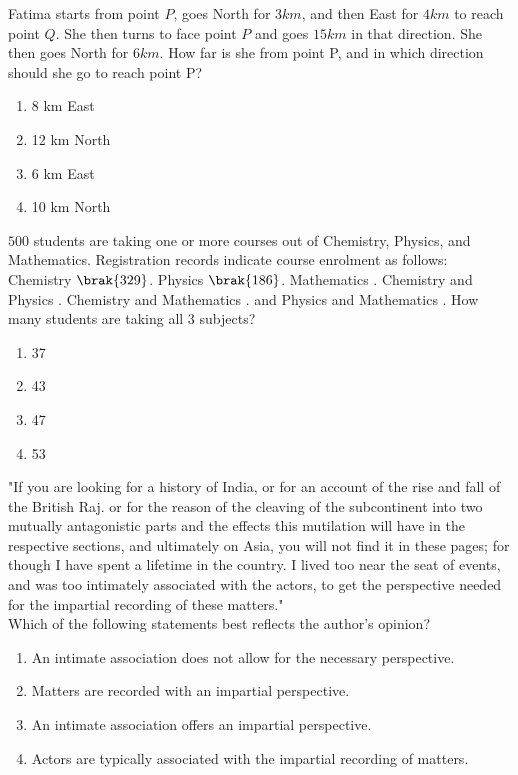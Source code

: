 \item Fatima starts from point $P$, goes North for $3 km$, and then East for $4 km$ to reach point $Q$. She then turns to face point $P$ and goes $15 km$ in that direction. She then goes North for $6 km$. How far is she from point P, and in which direction should she go to reach point P?
    \begin{enumerate}
        \item 8 km East
       \item 12 km North
        \item 6 km East
        \item 10 km North
\end{enumerate}
\item $500$ students are taking one or more courses out of Chemistry, Physics, and Mathematics.
Registration records indicate course enrolment as follows: Chemistry $\brak{329}$. Physics $\brak{186}$.
Mathematics . Chemistry and Physics . Chemistry and Mathematics . and Physics and Mathematics . How many students are taking all $3$ subjects?
\begin{enumerate}
    \item 37
    \item 43
    \item 47
    \item 53
\end{enumerate}
\item "If you are looking for a history of India, or for an account of the rise and fall of the British Raj. or for the reason of the cleaving of the subcontinent into two mutually antagonistic parts and the effects this mutilation will have in the respective sections, and ultimately on Asia, you will not find it in these pages; for though I have spent a lifetime in the country. I lived too near the seat of events, and was too intimately associated with the actors, to get the perspective needed for the impartial recording of these matters."\\
Which of the following statements best reflects the author's opinion?
\begin{enumerate}
    \item An intimate association does not allow for the necessary perspective.
    \item Matters are recorded with an impartial perspective.
    \item An intimate association offers an impartial perspective.
    \item Actors are typically associated with the impartial recording of matters.
\end{enumerate}
